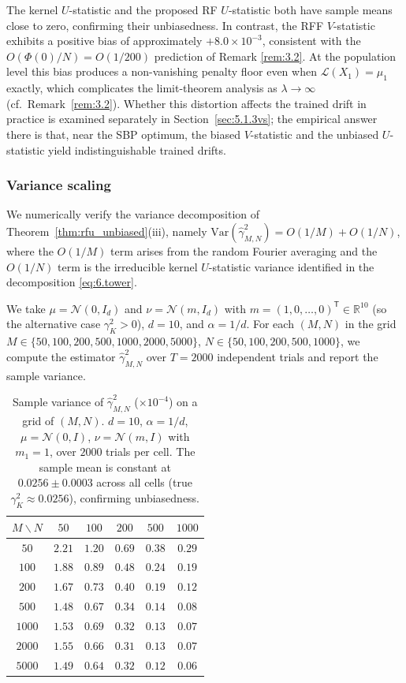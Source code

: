 \documentclass[11pt,leqno]{article}
\theoremstyle{plain}
\theoremstyle{remark}
\theoremstyle{definition}
\numberwithin{equation}{section}
\numberwithin{figure}{section}
\numberwithin{table}{section}
\numberwithin{algorithm}{section}
\newcommand{\RR}{\mathbb{R}}
\begin{document}
The kernel $U$-statistic and the proposed RF $U$-statistic both have sample means close to zero,
confirming their unbiasedness.
In contrast, the RFF $V$-statistic exhibits a positive bias of approximately $+8.0\times 10^{-3}$,
consistent with the $O(\Phi(0)/N)=O(1/200)$ prediction of Remark \ref{rem:3.2}.
At the population level this bias produces a non-vanishing penalty floor even when $\mathcal{L}(X_1)=\mu_1$ exactly,
which complicates the limit-theorem analysis as $\lambda\to\infty$
(cf.\ Remark~\ref{rem:3.2}).
Whether this distortion affects the trained drift in practice is examined separately in Section~\ref{sec:5.1.3vs};
the empirical answer there is that, near the SBP optimum,
the biased $V$-statistic and the unbiased $U$-statistic yield indistinguishable trained drifts.


\subsubsection{Variance scaling}\label{sec:5.1var}

We numerically verify the variance decomposition of Theorem~\ref{thm:rfu_unbiased}(iii),
namely $\mathrm{Var}(\hat{\gamma}_{M,N}^2)=O(1/M)+O(1/N)$,
where the $O(1/M)$ term arises from the random Fourier averaging
and the $O(1/N)$ term is the irreducible kernel $U$-statistic variance
identified in the decomposition \eqref{eq:6.tower}.

We take $\mu=\mathcal{N}(0,I_d)$ and $\nu=\mathcal{N}(m,I_d)$
with $m=(1,0,\ldots,0)^{\mathsf{T}}\in\RR^{10}$ (so the alternative case $\gamma_K^2>0$),
$d=10$, and $\alpha=1/d$.
For each $(M,N)$ in the grid $M\in\{50,100,200,500,1000,2000,5000\}$, $N\in\{50,100,200,500,1000\}$,
we compute the estimator $\hat{\gamma}_{M,N}^2$ over $T=2000$ independent trials
and report the sample variance.

\begin{table}[htbp]
\centering
\caption{Sample variance of $\hat{\gamma}_{M,N}^2$ ($\times 10^{-4}$) on a grid of $(M,N)$.
$d=10$, $\alpha=1/d$, $\mu=\mathcal{N}(0,I)$, $\nu=\mathcal{N}(m,I)$ with $m_1=1$,
over $2000$ trials per cell.
The sample mean is constant at $0.0256\pm 0.0003$ across all cells (true $\gamma_K^2\approx 0.0256$),
confirming unbiasedness.}
\label{tab:variance_scaling}
\begin{tabular}{c|ccccc}
\toprule
$M\backslash N$ & $50$ & $100$ & $200$ & $500$ & $1000$ \\
\midrule
$50$   & $2.21$ & $1.20$ & $0.69$ & $0.38$ & $0.29$ \\
$100$  & $1.88$ & $0.89$ & $0.48$ & $0.24$ & $0.19$ \\
$200$  & $1.67$ & $0.73$ & $0.40$ & $0.19$ & $0.12$ \\
$500$  & $1.48$ & $0.67$ & $0.34$ & $0.14$ & $0.08$ \\
$1000$ & $1.53$ & $0.69$ & $0.32$ & $0.13$ & $0.07$ \\
$2000$ & $1.55$ & $0.66$ & $0.31$ & $0.13$ & $0.07$ \\
$5000$ & $1.49$ & $0.64$ & $0.32$ & $0.12$ & $0.06$ \\
\bottomrule
\end{tabular}
\end{table}
\end{document}
